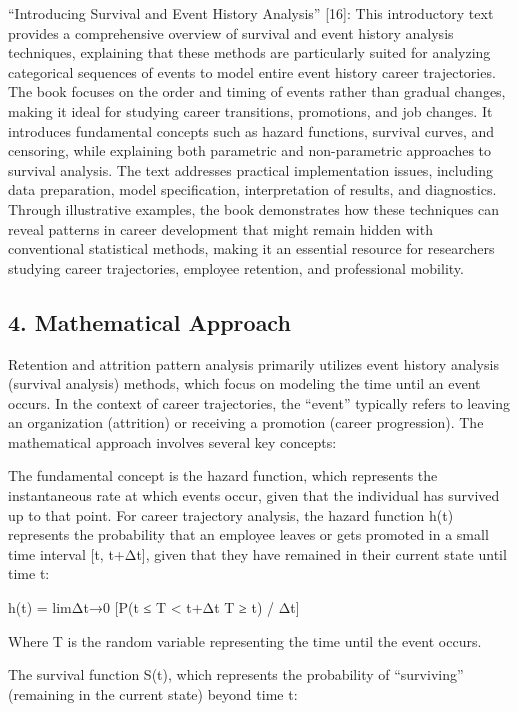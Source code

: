 \documentclass[./main.tex]{subfiles}
\begin{document}
``Introducing Survival and Event History Analysis'' {[}16{]}: This
introductory text provides a comprehensive overview of survival and
event history analysis techniques, explaining that these methods are
particularly suited for analyzing categorical sequences of events to
model entire event history career trajectories. The book focuses on the
order and timing of events rather than gradual changes, making it ideal
for studying career transitions, promotions, and job changes. It
introduces fundamental concepts such as hazard functions, survival
curves, and censoring, while explaining both parametric and
non-parametric approaches to survival analysis. The text addresses
practical implementation issues, including data preparation, model
specification, interpretation of results, and diagnostics. Through
illustrative examples, the book demonstrates how these techniques can
reveal patterns in career development that might remain hidden with
conventional statistical methods, making it an essential resource for
researchers studying career trajectories, employee retention, and
professional mobility.

\subsection{4. Mathematical Approach}\label{mathematical-approach}

Retention and attrition pattern analysis primarily utilizes event
history analysis (survival analysis) methods, which focus on modeling
the time until an event occurs. In the context of career trajectories,
the ``event'' typically refers to leaving an organization (attrition) or
receiving a promotion (career progression). The mathematical approach
involves several key concepts:

The fundamental concept is the hazard function, which represents the
instantaneous rate at which events occur, given that the individual has
survived up to that point. For career trajectory analysis, the hazard
function h(t) represents the probability that an employee leaves or gets
promoted in a small time interval {[}t, t+Δt{]}, given that they have
remained in their current state until time t:

h(t) = limΔt→0 {[}P(t ≤ T \textless{} t+Δt \textbar{} T ≥ t) / Δt{]}

Where T is the random variable representing the time until the event
occurs.

The survival function S(t), which represents the probability of
``surviving'' (remaining in the current state) beyond time t:
\end{document}
